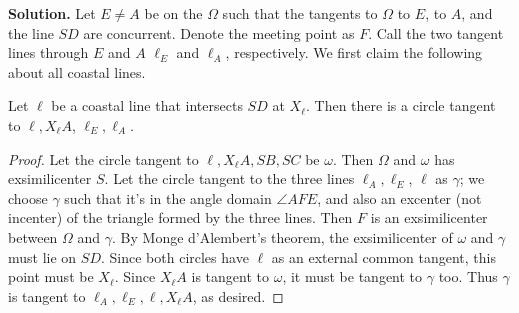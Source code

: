 \documentclass[11pt,a4paper]{article}
\begin{document}
\begin{enumerate}
        \textbf{Solution.} 
        Let $E\neq A$ be on the $\Omega$ such that the tangents to $\Omega$ to $E$, to $A$, and the line $SD$ are concurrent. Denote the meeting point as $F$. 
        Call the two tangent lines through $E$ and $A$ $\ell_E$ and $\ell_A$, respectively. 
        We first claim the following about all coastal lines. 
        
        \begin{lemma}
        	Let $\ell$ be a coastal line that intersects $SD$ at $X_{\ell}$. Then there is a circle tangent to $\ell, X_{\ell}A$, 
        	$\ell_E, \ell_A$. 
        \end{lemma}
        
        \begin{proof}
        	Let the circle tangent to $\ell, X_{\ell}A, SB,SC$ be $\omega$. 
        	Then $\Omega$ and $\omega$ has exsimilicenter $S$. 
        	Let the circle tangent to the three lines $\ell_A, \ell_E$, $\ell$ as $\gamma$; 
        	we choose $\gamma$ such that it's in the angle domain $\angle AFE$, and also an excenter (not incenter) of the triangle formed by the three lines. 
        	Then $F$ is an exsimilicenter between $\Omega$ and $\gamma$. 
        	By Monge d'Alembert's theorem, the exsimilicenter of $\omega$ and $\gamma$ must lie on $SD$. 
        	Since both circles have $\ell$ as an external common tangent, 
        	this point must be $X_{\ell}$. 
        	Since $X_{\ell}A$ is tangent to $\omega$, it must be tangent to $\gamma$ too. 
        	Thus $\gamma$ is tangent to $\ell_A, \ell_E, \ell, X_{\ell}A$, as desired. 
        \end{proof}
        

\end{enumerate}
\end{document}
